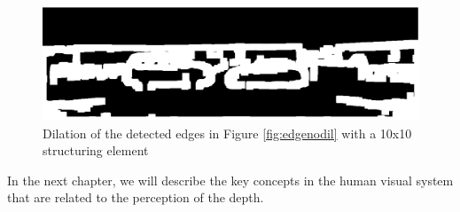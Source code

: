\begin{figure}[H]
\centering
\includegraphics[scale=0.35]{mask5dil}
\caption{Dilation of the detected edges in Figure \protect\ref{fig:edgenodil} with a 10x10 structuring element}
\label{fig:edgedil}
\end{figure}
\noindent
In the next chapter, we will describe the key concepts in the human visual system that are related to the perception of the depth.

